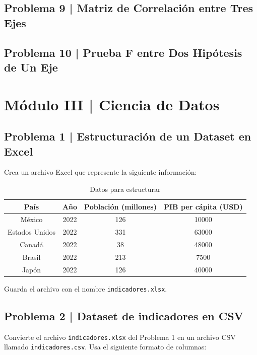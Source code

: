 \documentclass{article}
\begin{document}
\subsection*{Problema 9 | Matriz de Correlación entre Tres Ejes}

\subsection*{Problema 10 | Prueba F entre Dos Hipótesis de Un Eje}

\clearpage

\section*{Módulo III | Ciencia de Datos}

\subsection*{Problema 1 | Estructuración de un Dataset en Excel}

Crea un archivo Excel que represente la siguiente información:

\begin{table}[h]
    \centering
    \begin{tabular}{|c|c|c|c|}
        \hline
        País & Año & Población (millones) & PIB per cápita (USD) \\
        \hline
        México & 2022 & 126 & 10000 \\
        Estados Unidos & 2022 & 331 & 63000 \\
        Canadá & 2022 & 38 & 48000 \\
        Brasil & 2022 & 213 & 7500 \\
        Japón & 2022 & 126 & 40000 \\
        \hline
    \end{tabular}
    \caption{Datos para estructurar}
\end{table}

Guarda el archivo con el nombre \texttt{indicadores.xlsx}.

\clearpage

\subsection*{Problema 2 | Dataset de indicadores en CSV}

Convierte el archivo \texttt{indicadores.xlsx} del Problema 1 en un archivo CSV llamado \texttt{indicadores.csv}. Usa el siguiente formato de columnas:
\end{document}
